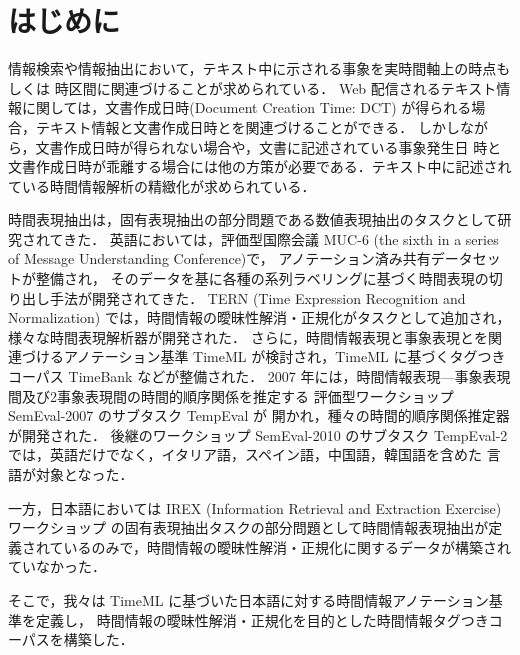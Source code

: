 \documentclass[japanese]{jnlp_1.4}
\newcommand{\modified}[1]{}
\begin{document}
\maketitle


\section{はじめに}

情報検索や情報抽出において，テキスト中に示される事象を実時間軸上の時点もしくは
時区間に関連づけることが求められている．
Web 配信されるテキスト情報に関しては，文書作成日時(Document Creation Time: DCT)
が得られる場合，テキスト情報と文書作成日時とを関連づけることができる．
しかしながら，文書作成日時が得られない場合や，文書に記述されている事象発生日
時と文書作成日時が乖離する場合には他の方策が必要である．テキスト中に記述されている時間情報解析の精緻化が求められている．

時間表現抽出は，固有表現抽出の部分問題である数値表現抽出のタスクとして研究されてきた．
英語においては，評価型国際会議 MUC-6 (the sixth in a series of Message Understanding Conference)\cite{MUC6}で，
アノテーション済み共有データセットが整備され，
そのデータを基に各種の系列ラベリングに基づく時間表現の切り出し手法が開発されてきた．
TERN (Time Expression Recognition and Normalization)\cite{TERN} では，時間情報の曖昧性解消・正規化がタスクとして追加され，様々な時間表現解析器が開発された．
さらに，時間情報表現と事象表現とを関連づけるアノテーション基準 TimeML \cite{TimeML}が検討され，TimeML に基づくタグつきコーパス TimeBank \cite{TimeBank}などが整備された．
2007 年には，時間情報表現—事象表現間及び2事象表現間の時間的順序関係を推定する
評価型ワークショップ SemEval-2007 のサブタスク TempEval \cite{TempEval} が
開かれ，種々の時間的順序関係推定器が開発された．
後継のワークショップ SemEval-2010 のサブタスク TempEval-2 \cite{TempEval2}
では，英語だけでなく，イタリア語，スペイン語，中国語，韓国語を含めた
\modified{5}言語が対象となった．
\modified{2013年に開かれる SemEval-2013 のサブタスク TempEval-3 では，データを大規模
化した英語，スペイン語が対象となっている．}

一方，日本語においては IREX (Information Retrieval and Extraction Exercise) ワークショップ \cite{IREX} の固有表現抽出タスクの部分問題として時間情報表現抽出が定義されているのみで，時間情報の曖昧性解消・正規化に関するデータが構築されていなかった．

そこで，我々は TimeML に基づいた日本語に対する時間情報アノテーション基準を定義し，
時間情報の曖昧性解消・正規化を目的とした時間情報タグつきコーパスを構築した．
\modified{他言語のコーパスが新聞記事のみを対象としているのに対し，本研究では均衡
コーパスである『現代日本語書き言葉均衡コーパス』(Balanced Corpus of Contemporary Written Japanese;
以下 ``BCCWJ'')を対象としており，新聞記事だけでなく，一般書籍・雑誌・ブログなど
に出現する多様な時間情報表現を対象としている．
本稿ではアノテーション基準を示すとともに，アノテーションしたコーパスの詳細について示す．}
\end{document}

